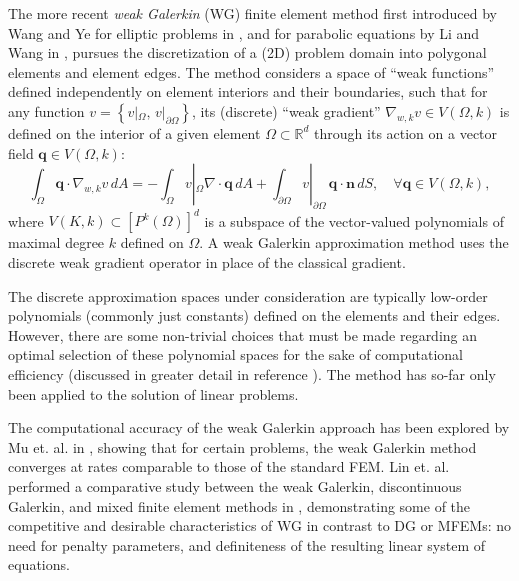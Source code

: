 			
		
		The more recent \textit{weak Galerkin} (WG) finite element method first introduced by Wang and Ye for elliptic problems in \cite{Wang:13}, and for parabolic equations by Li and Wang in \cite{Li:13}, pursues the discretization of a (2D) problem domain into polygonal elements and element edges. The method considers a space of ``weak functions'' defined independently on element interiors and their boundaries, such that for any function $v = \left\{ v|_\Omega, \, v|_{\partial \Omega} \right\}$, its (discrete) ``weak gradient'' $\nabla_{w,k} v \in V(\Omega,k)$ is defined on the interior of a given element $\Omega \subset \mathbb{R}^d$ through its action on a vector field $\mathbf{q} \in V(\Omega,k)$:
\begin{equation}
	\int_\Omega \mathbf{q} \cdot \nabla_{w,k} v \, dA = - \int_\Omega v|_\Omega \nabla \cdot \mathbf{q} \, dA + \int_{\partial \Omega} v|_{\partial \Omega} \, \mathbf{q} \cdot \mathbf{n} \, dS, \quad \forall \mathbf{q} \in V(\Omega,k),
\end{equation}
where $V(K,k) \subset \left[ P^k (\Omega) \right]^d$ is a subspace of the vector-valued polynomials of maximal degree $k$ defined on $\Omega$. A weak Galerkin approximation method uses the discrete weak gradient operator in place of the classical gradient.

	The discrete approximation spaces under consideration are typically low-order polynomials (commonly just constants) defined on the elements and their edges. However, there are some non-trivial choices that must be made regarding an optimal selection of these polynomial spaces for the sake of computational efficiency (discussed in greater detail in reference \cite{Mu:15:1}). The method has so-far only been applied to the solution of linear problems.

	The computational accuracy of the weak Galerkin approach has been explored by Mu et. al. in \cite{Mu:13}, showing that for certain problems, the weak Galerkin method converges at rates comparable to those of the standard FEM. Lin et. al. performed a comparative study between the weak Galerkin, discontinuous Galerkin, and mixed finite element methods in \cite{Lin:15}, demonstrating some of the competitive and desirable characteristics of WG in contrast to DG or MFEMs: no need for penalty parameters, and definiteness of the resulting linear system of equations.

